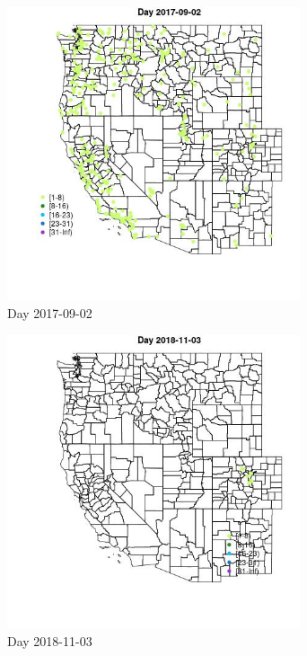 \begin{figure} 
\centering  
\includegraphics[width=0.77\textwidth]{Code_Outputs/Report_ML_input_PM25_Step4_part_e_de_duplicated_aveswNAs_MapObsDay2017-09-02.jpg} 
\caption{\label{fig:Report_ML_input_PM25_Step4_part_e_de_duplicated_aveswNAsMapObsDay2017-09-02}Day 2017-09-02} 
\end{figure} 
 

\begin{figure} 
\centering  
\includegraphics[width=0.77\textwidth]{Code_Outputs/Report_ML_input_PM25_Step4_part_e_de_duplicated_aveswNAs_MapObsDay2018-11-03.jpg} 
\caption{\label{fig:Report_ML_input_PM25_Step4_part_e_de_duplicated_aveswNAsMapObsDay2018-11-03}Day 2018-11-03} 
\end{figure} 
 

